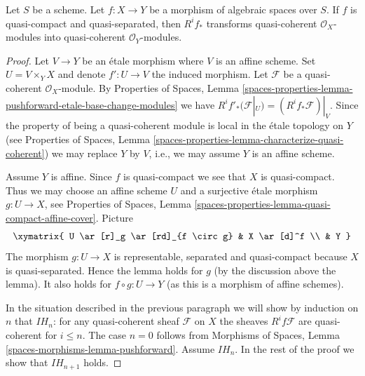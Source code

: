 %
\begin{lemma}
\label{lemma-higher-direct-image}
Let $S$ be a scheme. Let $f : X \to Y$ be a morphism of algebraic spaces
over $S$. If $f$ is quasi-compact and quasi-separated, then $R^if_*$
transforms quasi-coherent $\mathcal{O}_X$-modules into
quasi-coherent $\mathcal{O}_Y$-modules.
\end{lemma}

\begin{proof}
Let $V \to Y$ be an \'etale morphism where $V$ is an affine scheme. Set
$U = V \times_Y X$ and denote $f' : U \to V$ the induced morphism.
Let $\mathcal{F}$ be a quasi-coherent $\mathcal{O}_X$-module. By
Properties of Spaces, Lemma
\ref{spaces-properties-lemma-pushforward-etale-base-change-modules}
we have
$R^if'_*(\mathcal{F}|_U) = (R^if_*\mathcal{F})|_V$.
Since the property of being a quasi-coherent module is local in the
\'etale topology on $Y$ (see
Properties of Spaces, Lemma
\ref{spaces-properties-lemma-characterize-quasi-coherent})
we may replace $Y$ by $V$, i.e., we may assume $Y$ is an affine scheme.

\medskip\noindent
Assume $Y$ is affine. Since $f$ is quasi-compact we see that $X$
is quasi-compact. Thus we may choose an affine scheme $U$ and a surjective
\'etale morphism $g : U \to X$, see
Properties of Spaces,
Lemma \ref{spaces-properties-lemma-quasi-compact-affine-cover}.
Picture
$$
\xymatrix{
U \ar[r]_g \ar[rd]_{f \circ g} & X \ar[d]^f \\
& Y
}
$$
The morphism $g : U \to X$ is representable, separated
and quasi-compact because $X$ is quasi-separated. Hence the lemma
holds for $g$ (by the discussion above the lemma).
It also holds for $f \circ g : U \to Y$ (as this is a morphism
of affine schemes).

\medskip\noindent
In the situation described in the previous paragraph we will show by
induction on $n$ that $IH_n$: for any quasi-coherent sheaf $\mathcal{F}$
on $X$ the sheaves $R^if\mathcal{F}$
are quasi-coherent for $i \leq n$.
The case $n = 0$ follows from
Morphisms of Spaces, Lemma \ref{spaces-morphisms-lemma-pushforward}.
Assume $IH_n$. In the rest of the proof we show that $IH_{n + 1}$ holds.


\end{proof}
